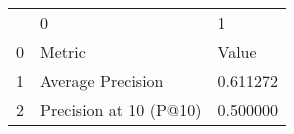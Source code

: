 \begin{tabular}{lll}
 & 0 & 1 \\
0 & Metric & Value \\
1 & Average Precision & 0.611272 \\
2 & Precision at 10 (P@10) & 0.500000 \\
\end{tabular}

